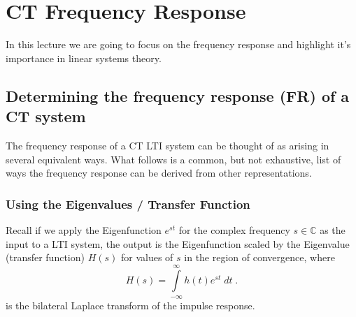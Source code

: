 \chapter{CT Frequency Response}

In this lecture we are going to focus on the frequency response and highlight it's importance in linear systems theory.

\section{Determining the frequency response (FR) of a CT system}

The frequency response of a CT LTI system can be thought of as arising in several equivalent ways. What follows is a common, but not exhaustive, list of ways the frequency response can be derived from other representations.

\subsection*{Using the Eigenvalues / Transfer Function}

Recall if we apply the Eigenfunction $e^{st}$ for the complex frequency $s \in \mathbb{C}$ as the input to a LTI system, the output is the Eigenfunction scaled by the Eigenvalue (transfer function) $H(s)$ for values of $s$ in the region of convergence, where
\[
H(s) = \int\limits_{-\infty}^{\infty} h(t) e^{st}\; dt \; .
\]
is the bilateral Laplace transform of the impulse response.

